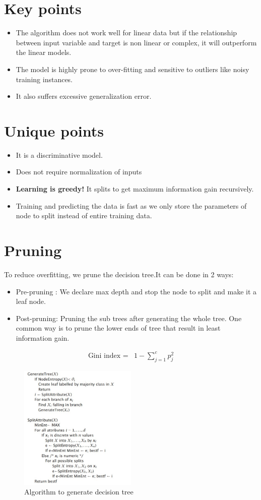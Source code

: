 \documentclass[12pt,letterpaper, onecolumn]{exam}
\begin{document}
\section*{Key points}
\begin{itemize}
\item The algorithm does not work well for linear data but if the relationship between input variable and target is non linear or complex, it will outperform the linear models.
\item The model is highly prone to over-fitting and sensitive to outliers like noisy training instances.
\item It also suffers excessive generalization error.
\end{itemize}
\section*{Unique points}
\begin{itemize}
\item It is a discriminative model.
\item Does not require normalization of inputs
\item \textbf{Learning is greedy!} It splits to get maximum information gain recursively.
\item Training and predicting the data is fast as we only store the parameters of node to split instead of entire training data.
\end{itemize}
\section*{Pruning}
To reduce overfitting, we prune the decision tree.It can be done in 2 ways:
\begin{itemize}
\item Pre-pruning : We declare max depth and stop the node to split and make it a leaf node.
\item Post-pruning: Pruning the sub trees after generating the whole tree. One common way is to prune the lower ends of tree that result in least information gain.
\end{itemize}
\begin{align}
\text{Gini index } = {}& 1-\sum_{j= 1}^c p_j^2
\end{align}
\begin{figure}[!h]
\caption{Algorithm to generate decision tree}
\centering
\includegraphics[width = 0.5\textwidth]{../images/tree_gen.jpg}
\end{figure}
\newpage
\end{document}
